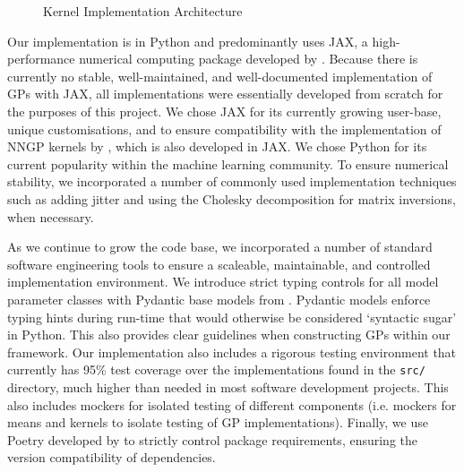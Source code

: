 \documentclass{article}
\def\code#1{\texttt{#1}}
\numberwithin{equation}{section}
\begin{document}
\begin{figure}[h!]
\begin{center}
{
}
\caption{Kernel Implementation Architecture}
\label{kernel-implementation}
\end{center}
\end{figure}

Our implementation is in Python and predominantly uses JAX, a high-performance numerical computing package developed by \cite{jax2018github}.
Because there is currently no stable, well-maintained, and well-documented implementation of GPs with JAX, all implementations were essentially developed from scratch for the purposes of this project.
We chose JAX for its currently growing user-base, unique customisations, and to ensure compatibility with the implementation of NNGP kernels by \cite{novak2019neural}, which is also developed in JAX.
We chose Python for its current popularity within the machine learning community.
To ensure numerical stability, we incorporated a number of commonly used implementation techniques such as adding jitter and using the Cholesky decomposition for matrix inversions, when necessary.

As we continue to grow the code base, we incorporated a number of standard software engineering tools to ensure a scaleable, maintainable, and controlled implementation environment.
We introduce strict typing controls for all model parameter classes with Pydantic base models from \cite{samuel_colvin_2023_8277473}.
Pydantic models enforce typing hints during run-time that would otherwise be considered `syntactic sugar' in Python. This also provides clear guidelines when constructing GPs within our framework.
Our implementation also includes a rigorous testing environment that currently has 95\% test coverage over the implementations found in the \code{src/} directory, much higher than needed in most software development projects.
This also includes mockers for isolated testing of different components (i.e. mockers for means and kernels to isolate testing of GP implementations). Finally, we use Poetry developed by \cite{Eustace} to strictly control package requirements, ensuring the version compatibility of dependencies.
\end{document}
